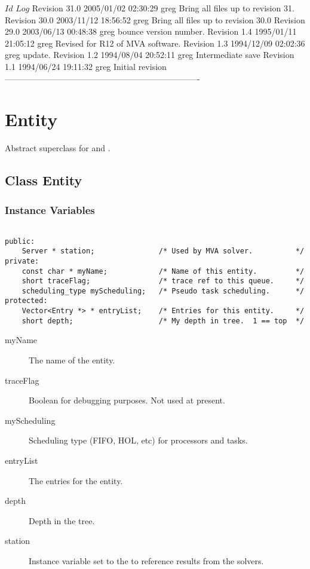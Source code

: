 \C 
\C $Id$
\C 
\C $Log$
\C Revision 31.0  2005/01/02 02:30:29  greg
\C Bring all files up to revision 31.
\C
\C Revision 30.0  2003/11/12 18:56:52  greg
\C Bring all files up to revision 30.0
\C
\C Revision 29.0  2003/06/13 00:48:38  greg
\C bounce version number.
\C
\C Revision 1.4  1995/01/11 21:05:12  greg
\C Revised for R12 of MVA software.
\C
\C Revision 1.3  1994/12/09  02:02:36  greg
\C update.
\C
\C Revision 1.2  1994/08/04  20:52:11  greg
\C Intermediate save
\C
\C Revision 1.1  1994/06/24  19:11:32  greg
\C Initial revision
\C
\C ----------------------------------------------------------------------
\section{Entity}
\label{sec:entity}

Abstract superclass for  and
. 

\subsection{Class Entity}
\subsubsection{Instance Variables}
\label{sec:entity-ivars}

\begin{verbatim}

public:
    Server * station;               /* Used by MVA solver.          */
private:
    const char * myName;            /* Name of this entity.         */
    short traceFlag;                /* trace ref to this queue.     */
    scheduling_type myScheduling;   /* Pseudo task scheduling.      */
protected:
    Vector<Entry *> * entryList;    /* Entries for this entity.     */
    short depth;                    /* My depth in tree.  1 == top  */
\end{verbatim}

\begin{description}
\item[myName] \texonly{---} The name of the entity.
\item[traceFlag] \texonly{---} Boolean for debugging purposes.  Not
  used at present.
\item[myScheduling] \texonly{---} Scheduling type (FIFO, HOL, etc) for
  processors and tasks.
\item[entryList] \texonly{---} The entries for the entity.
\item[depth] \texonly{---} Depth in the tree.
\item[station] \texonly{---} Instance variable set to the
   to reference results from the
   solvers.
\end{description}

